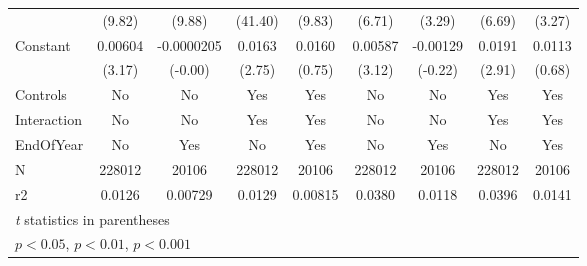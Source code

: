 {\begin{tabular}{l*{8}{c}}
                &   (9.82)         &   (9.88)         &  (41.40)         &   (9.83)         &   (6.71)         &   (3.29)         &   (6.69)         &   (3.27)         \\
[1em]
Constant        &  0.00604\sym{**} &-0.0000205         &   0.0163\sym{**} &   0.0160         &  0.00587\sym{**} & -0.00129         &   0.0191\sym{**} &   0.0113         \\
                &   (3.17)         &  (-0.00)         &   (2.75)         &   (0.75)         &   (3.12)         &  (-0.22)         &   (2.91)         &   (0.68)         \\
\hline
Controls        &       No         &       No         &      Yes         &      Yes         &       No         &       No         &      Yes         &      Yes         \\
Interaction     &       No         &       No         &      Yes         &      Yes         &       No         &       No         &      Yes         &      Yes         \\
EndOfYear       &       No         &      Yes         &       No         &      Yes         &       No         &      Yes         &       No         &      Yes         \\
N               &   228012         &    20106         &   228012         &    20106         &   228012         &    20106         &   228012         &    20106         \\
r2              &   0.0126         &  0.00729         &   0.0129         &  0.00815         &   0.0380         &   0.0118         &   0.0396         &   0.0141         \\
\hline\hline
\multicolumn{9}{l}{\footnotesize \textit{t} statistics in parentheses}\\
\multicolumn{9}{l}{\footnotesize \sym{*} \(p<0.05\), \sym{**} \(p<0.01\), \sym{***} \(p<0.001\)}\\
\end{tabular}
}

